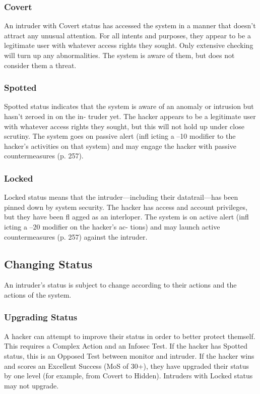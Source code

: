 \subsubsection{Covert}

An intruder with Covert status has accessed the 
system in a manner that doesn't attract any unusual 
attention. For all intents and purposes, they appear 
to be a legitimate user with whatever access rights 
they sought. Only extensive checking will turn up any 
abnormalities. The system is aware of them, but does 
not consider them a threat.

\subsubsection{Spotted}

Spotted status indicates that the system is aware of an 
anomaly or intrusion but hasn't zeroed in on the in-
truder yet. The hacker appears to be a legitimate user 
with whatever access rights they sought, but this will 
not hold up under close scrutiny. The system goes on 
passive alert (infl icting a –10 modifier to the hacker's 
activities on that system) and may engage the hacker 
with passive countermeasures (p. 257).

\subsubsection{Locked}

Locked status means that the intruder—including their 
datatrail—has been pinned down by system security. 
The hacker has access and account privileges, but they 
have been fl agged as an interloper. The system is on 
active alert (infl icting a –20 modifier on the hacker's ac-
tions) and may launch active countermeasures (p. 257) 
against the intruder.

\subsection{Changing Status}

An intruder's status is subject to change according to 
their actions and the actions of the system.

\subsubsection{Upgrading Status}

A hacker can attempt to improve their status in order 
to better protect themself. This requires a Complex 
Action and an Infosec Test. If the hacker has Spotted 
status, this is an Opposed Test between monitor and 
intruder. If the hacker wins and scores an Excellent 
Success (MoS of 30+), they have upgraded their status 
by one level (for example, from Covert to Hidden). 
Intruders with Locked status may not upgrade.

